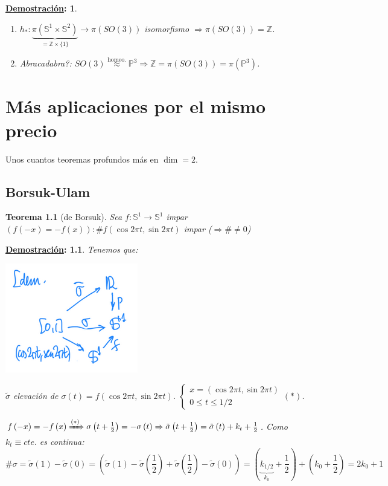 \documentclass[10pt,a4paper,openright]{book}
\theoremstyle{break}
\newtheorem*{theo}{Teorema}
\newtheorem*{demo}{\underline{Demostración}:}
\begin{document}
\begin{demo}
\begin{enumerate}
    \item $h_*: \underbrace{\pi\left( \mathbb{S}^{1} \times \mathbb{S}^{2} \right)}_{= \mathbb{Z} \times \{1\}} \rightarrow \pi\left( SO\left( 3 \right) \right)$ isomorfismo $\Rightarrow \pi\left( SO\left( 3 \right) \right) = \mathbb{Z}$.

    \item Abracadabra?: $SO\left( 3 \right) \stackrel{\text{homeo.}}{\approx} \mathbb{P}^{3} \Rightarrow \mathbb{Z} = \pi\left( SO\left( 3 \right) \right) = \pi \left( \mathbb{P}^{3} \right)$.
\end{enumerate}
\end{demo}


\chapter{Más aplicaciones por el mismo precio}%
\label{cha:mas_aplicaciones_por_el_mismo_precio}
Unos cuantos teoremas profundos más en $\dim = 2$.
\section{Borsuk-Ulam}%
\label{sec:borsuk_ulam}
\begin{theo}[de Borsuk]
Sea $f: \mathbb{S}^{1} \rightarrow \mathbb{S}^{1}$ impar $\left( f\left( -x \right) = -f\left( x \right) \right): \# f\left( \cos 2 \pi t, \sin 2 \pi t \right)$ impar ($\Rightarrow \# \neq 0$) 
\end{theo}
\begin{demo}
Tenemos que:
\begin{center}
    \includegraphics[scale=0.3]{images/th_borsuk} 
\end{center}
$\tilde{\sigma}$ elevación de $\sigma\left( t \right) = f\left( \cos 2 \pi t, \sin 2 \pi t \right)$. $\begin{cases}
    x = \left( \cos 2 \pi t, \sin 2 \pi t \right)\\
    0 \le t \le 1/2
\end{cases} (*)$.

$f\left( -x \right) = -f\left( x \right) \xRightarrow{(*)} \sigma\left( t + \frac{1}{2} \right) = -\sigma\left( t \right) \Rightarrow \tilde{\sigma} \left( t + \frac{1}{2} \right) = \tilde{\sigma} \left( t \right) + k_t + \frac{1}{2}$. Como $k_t \equiv cte.$ es continua:
\[
    \# \sigma = \tilde{\sigma} \left( 1 \right) - \tilde{\sigma} \left( 0 \right) = \left( \tilde{\sigma} \left( 1 \right) - \tilde{\sigma}{\left( \frac{1}{2} \right)} + \tilde{\sigma} \left( \frac{1}{2} \right) - \tilde{\sigma} \left( 0 \right) \right) = \left( \underbrace{k_{1/2}}_{k_0} + \frac{1}{2} \right) + \left( k_0 + \frac{1}{2} \right) = 2k_0 + 1
\]
\end{demo}
\end{document}
